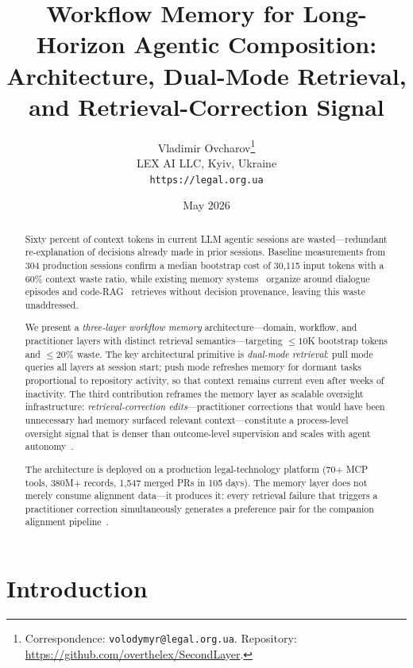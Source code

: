 \documentclass[11pt]{article}
\title{%
  Workflow Memory for Long-Horizon Agentic Composition:\\
  Architecture, Dual-Mode Retrieval, and Retrieval-Correction Signal%
}
\author{
  Vladimir Ovcharov\thanks{Correspondence: \texttt{volodymyr@legal.org.ua}.
    Repository: \url{https://github.com/overthelex/SecondLayer}.}\\
  LEX AI LLC, Kyiv, Ukraine\\
  \texttt{https://legal.org.ua}
}
\date{May 2026}
\begin{document}
\maketitle

\begin{abstract}
Sixty percent of context tokens in current LLM agentic sessions are wasted---redundant re-explanation of decisions already made in prior sessions.
Baseline measurements from 304 production sessions confirm a median bootstrap cost of 30{,}115 input tokens with a 60\% context waste ratio, while existing memory systems~\citep{packer2023memgpt, park2023generative, chhikara2025mem0} organize around dialogue episodes and code-RAG~\citep{zhang2023repocoder, wang2024coderagbench} retrieves without decision provenance, leaving this waste unaddressed.

We present a \emph{three-layer workflow memory} architecture---domain, workflow, and practitioner layers with distinct retrieval semantics---targeting ${\leq}10$K bootstrap tokens and ${\leq}20\%$ waste.
The key architectural primitive is \emph{dual-mode retrieval}: pull mode queries all layers at session start; push mode refreshes memory for dormant tasks proportional to repository activity, so that context remains current even after weeks of inactivity.
The third contribution reframes the memory layer as scalable oversight infrastructure: \emph{retrieval-correction edits}---practitioner corrections that would have been unnecessary had memory surfaced relevant context---constitute a process-level oversight signal that is denser than outcome-level supervision and scales with agent autonomy~\citep{ovcharov2026recursive}.

The architecture is deployed on a production legal-technology platform (70+ MCP tools, 380M+ records, 1{,}547 merged PRs in 105 days).
The memory layer does not merely consume alignment data---it produces it: every retrieval failure that triggers a practitioner correction simultaneously generates a preference pair for the companion alignment pipeline~\citep{ovcharov2026recursive}.
\end{abstract}

\section{Introduction}
\label{sec:intro}
\end{document}
